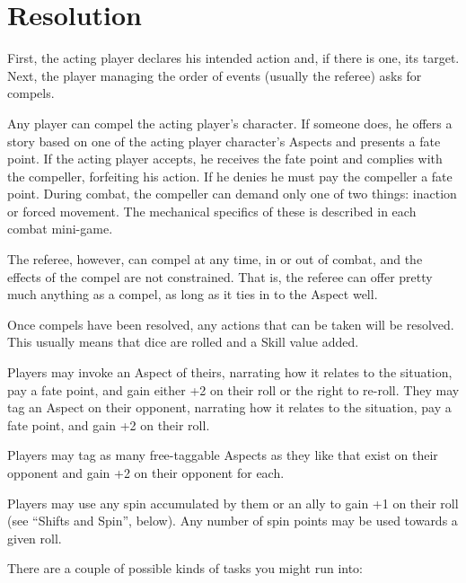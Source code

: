 \section{Resolution}
\label{sec:resolution}

First, the acting player declares his intended action and, if there is one, its target. Next, the player managing the order of events (usually the referee) asks for compels.

Any player can compel the acting player's character. If someone does, he offers a story based on one of the acting player character's Aspects and presents a fate point. If the acting player accepts, he receives the fate point and complies with the compeller, forfeiting his action. If he denies he must pay the compeller a fate point. During combat, the compeller can demand only one of two things: inaction or forced movement. The mechanical specifics of these is described in each combat mini-game.

The referee, however, can compel at any time, in or out of combat, and the effects of the compel are not constrained. That is, the referee can offer pretty much anything as a compel, as long as it ties in to the Aspect well.

Once compels have been resolved, any actions that can be taken will be resolved. This usually means that dice are rolled and a Skill value added.

Players may invoke an Aspect of theirs, narrating how it relates to the situation, pay a fate point, and gain either +2 on their roll or the right to re-roll. They may tag an Aspect on their opponent, narrating how it relates to the situation, pay a fate point, and gain +2 on their roll.

Players may tag as many free-taggable Aspects as they like that exist on their opponent and gain +2 on their opponent for each.

Players may use any spin accumulated by them or an ally to gain +1 on their roll (see ``Shifts and Spin'', below). Any number of spin points may be used towards a given roll.


There are a couple of possible kinds of tasks you might run into:




